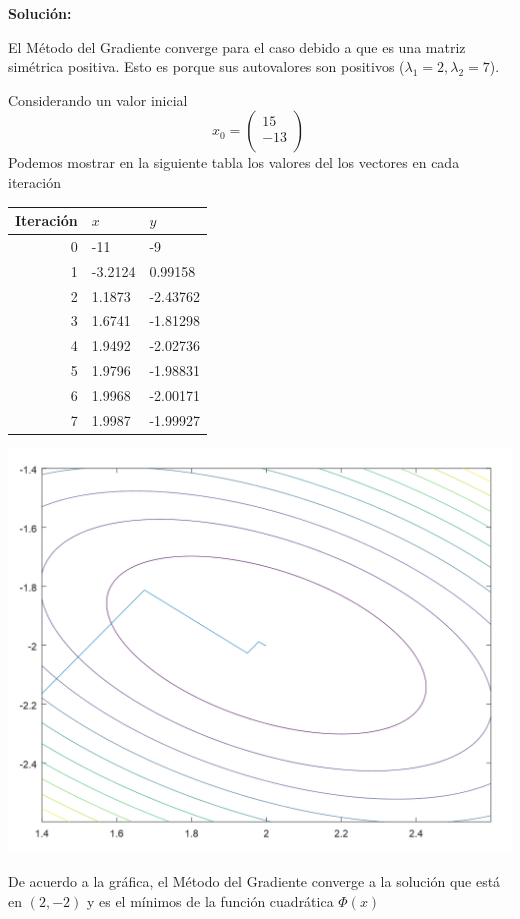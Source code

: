\textbf{Solución:}

El Método del Gradiente converge para el caso debido a que es una matriz simétrica positiva. Esto es porque sus autovalores son positivos ($ \lambda_1=2, \lambda_2=7$).

Considerando un valor inicial 
$$x_0 = \begin{pmatrix}
     15 \\
     -13 \\
    \end{pmatrix}\ $$
Podemos mostrar en la siguiente tabla los valores del los vectores en cada iteración

\begin{table}[h]
    \centering
    \begin{tabular}{|r|l|l|}
        Iteración & $x$ &    $y$   \\
        \hline
         0  &  -11  &  -9 \\
         1  & -3.2124 & 0.99158 \\
         2  & 1.1873 & -2.43762 \\
         3  & 1.6741 & -1.81298 \\
         4  & 1.9492 & -2.02736 \\
         5  & 1.9796 & -1.98831 \\
         6  & 1.9968 & -2.00171 \\
         7  & 1.9987 & -1.99927\\
    \end{tabular}
\end{table}

\begin{center}
    \includegraphics[scale=0.5]{AlfioQuarteroni/Laura.png} 
\end{center} 

De acuerdo a la gráfica, el Método del Gradiente converge a la solución que está en $(2,-2)$ y es el mínimos de la función cuadrática $\Phi(x)$\\